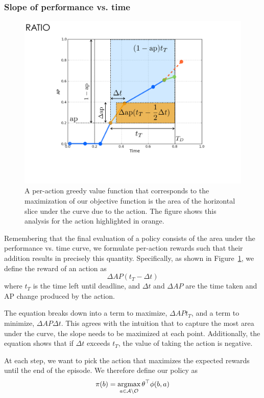\subsubsection{Slope of performance vs. time}
\begin{figure}[htb]
  \centering
  \includegraphics[width=0.56\linewidth]{figures/apvst_expl.pdf}
  \caption{A per-action greedy value function that corresponds to the maximization of our objective function is the area of the horizontal slice under the curve due to the action. The figure shows this analysis for the action highlighted in orange.}
  \label{fig:rewards}
\end{figure}

Remembering that the final evaluation of a policy consists of the area under the performance vs. time curve, we formulate per-action rewards such that their addition results in precisely this quantity.
Specifically, as shown in Figure~\ref{fig:rewards}, we define the reward of an action as
\begin{equation}\label{eq:advanced}
\Delta AP (t_T-\Delta t)
\end{equation}
where $t_T$ is the time left until deadline, and $\Delta t$ and $\Delta AP$ are the time taken and AP change produced by the action.

The equation breaks down into a term to maximize, $\Delta AP t_T$, and a term to minimize, $\Delta AP \Delta t$.
This agrees with the intuition that to capture the most area under the curve, the slope needs to be maximized at each point.
Additionally, the equation shows that if $\Delta t$ exceeds $t_T$, the value of taking the action is negative.

At each step, we want to pick the action that maximizes the expected rewards until the end of the episode.
We therefore define our policy as
\begin{equation}
\pi(b) = \argmax_{a \in \mathcal{A} \setminus \mathcal{O}} \theta^\top \phi(b,a)
\end{equation}

